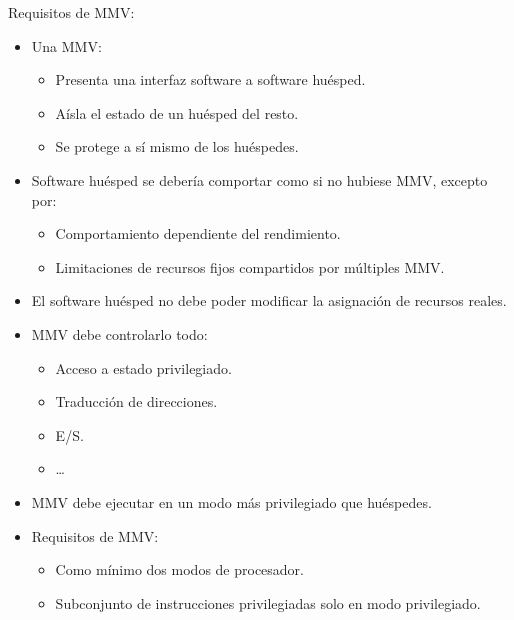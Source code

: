 \documentclass[12pt, twoside, openright]{report} %
\begin{document}
Requisitos de MMV:

\begin{itemize}

	\item Una MMV:

	      \begin{itemize}

		      \item Presenta una interfaz software a software huésped.
		      \item Aísla el estado de un huésped del resto.
		      \item Se protege a sí mismo de los huéspedes.
	      \end{itemize}
	\item Software huésped se debería comportar como si no hubiese MMV,
	      excepto por:

	      \begin{itemize}

		      \item Comportamiento dependiente del rendimiento.
		      \item Limitaciones de recursos fijos compartidos por múltiples MMV.
	      \end{itemize}
	\item El software huésped no debe poder modificar la asignación de
	      recursos reales.
	\item MMV debe controlarlo todo:

	      \begin{itemize}

		      \item Acceso a estado privilegiado.
		      \item Traducción de direcciones.
		      \item E/S.

		      \item \ldots{}
	      \end{itemize}
	\item MMV debe ejecutar en un modo más privilegiado que huéspedes.
	\item Requisitos de MMV:

	      \begin{itemize}

		      \item Como mínimo dos modos de procesador.
		      \item Subconjunto de instrucciones privilegiadas solo en modo
		            privilegiado.
	      \end{itemize}
\end{itemize}
\end{document}
